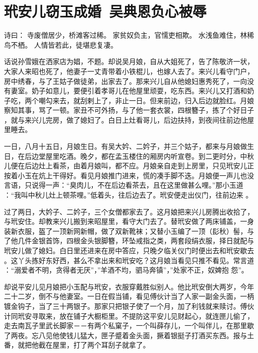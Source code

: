 \chapter{玳安儿窃玉成婚~吴典恩负心被辱}

诗曰：
寺废僧居少，桥滩客过稀。
家贫奴负主，官懦吏相欺。
水浅鱼难住，林稀鸟不栖。
人情皆若此，徒堪悲复凄。

话说孙雪娥在洒家店为娼，不题。却说吴月娘，自从大姐死了，告了陈敬济一状，
大家人来昭也死了，他妻子一丈青带着小铁棍儿，也嫁人去了。来兴儿看守门户，
房中绣春，与了王姑子做徒弟，出家去了。那来兴儿自从他媳妇惠秀死了，一向没
有妻室。奶子如意儿，要便引着孝哥儿在他屋里顽耍，吃东西。来兴儿又打酒和奶
子吃，两个嘲勾来去，就刮剌上了，非止一日。但来前边，归入后边就脸红。月娘
察知其事，骂了一顿。家丑不可外扬，与了他一套衣裳，四根簪子，拣了个好日子
，就与来兴儿完房，做了媳妇了。白日上灶看哥儿，后边扶持，到夜间往前边他屋
里睡去。

一日，八月十五日，月娘生日。有吴大妗、二妗子，并三个姑子，都来与月娘做生
日，在后边堂屋里吃酒。晚夕，都在孟玉楼住的厢房内听宣卷。到二更时分，中秋
儿便在后边灶上看茶，由着月娘叫，都不应。月娘亲自走到上房里，只见玳安儿正
按着小玉在炕上干得好。看见月娘推门进来，慌的凑手脚不迭。月娘便一声儿也没
言语，只说得一声：“臭肉儿，不在后边看茶去，且在这里做甚么哩。”那小玉道
：“我叫中秋儿灶上顿茶哩。”低着头，往后边去了。玳安便走出仪门，往前边来
。

过了两日，大妗子、二妗子，三个女僧都家去了。这月娘把来兴儿房腾出收拾了，
与玳安住。却教来兴儿搬到来昭屋里，看守大门去了。替玳安做了两床铺盖，一身
装新衣服，盔了一顶新网新帽，做了双新靴袜；又替小玉编了一顶（髟秋）髻，与
了他几件金银首饰，四根金头银脚簪，环坠戒指之类，两套段绢衣服，择日就配与
玳安儿做了媳妇。白日里还进来在房中答应，只晚夕临关仪门时便出去和玳安歇去
。这丫头拣好东好西，甚么不拿出来和玳安吃？这月娘当看见只推不看见。常言道
：“溺爱者不明，贪得者无厌”，”羊酒不均，驷马奔镇”，”处家不正，奴婢抱
怨”。

却说平安儿见月娘把小玉配与玳安，衣服穿戴胜似别人。他比玳安倒大两岁，今年
二十二岁，倒不与他妻室。一日在假当铺，看见傅伙计当了人家一副金头面，一柄
镀金钩子，当了三十两银子。那家只把银子使了一个月，加了利钱就来赎讨。傅伙
计同玳安寻取来，放在铺子大橱柜里。不提防这平安儿见财起心，就连匣儿偷了，
走去南瓦子里武长脚家－－有两个私窠子，一个叫薛存儿，一个叫伴儿，在那里歇
了两夜。忘八见他使钱儿猛大，匣子蹙着金头面，撅着银挺子打酒买东西。报与土
番，就把他截在屋里，打了两个耳刮子就拿了。

